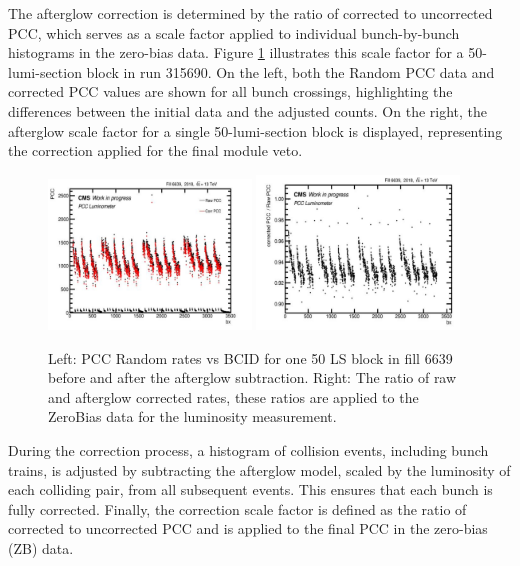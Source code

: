The afterglow correction is determined by the ratio of corrected to uncorrected PCC, which serves as a scale factor applied to individual bunch-by-bunch histograms in the zero-bias data. Figure \ref{fig:afterglowcorrection} illustrates this scale factor for a 50-lumi-section block in run 315690. On the left, both the Random PCC data and corrected PCC values are shown for all bunch crossings, highlighting the differences between the initial data and the adjusted counts. On the right, the afterglow scale factor for a single 50-lumi-section block is displayed, representing the correction applied for the final module veto.


\begin{figure}[H]
    \centering
    \includegraphics[width=0.48\textwidth]{figures/performance_PCC/afterglow_correction_factor_1lsblock_315690_2.png}
    \includegraphics[width=0.48\textwidth]{figures/performance_PCC/afterglow_correction_factor_1lsblock_315690_3.png}
    \caption[PCC Random Rates vs BCID Before and After Afterglow Subtraction (Fill 6639)]{Left: PCC Random rates vs BCID for one 50 LS block in fill 6639 before and after the afterglow subtraction. Right: The ratio of raw and afterglow corrected rates, these ratios are applied to the ZeroBias data for the luminosity measurement.}
    \label{fig:afterglowcorrection}
\end{figure}


During the correction process, a histogram of collision events, including bunch trains, is adjusted by subtracting the afterglow model, scaled by the luminosity of each colliding pair, from all subsequent events. This ensures that each bunch is fully corrected. Finally, the correction scale factor is defined as the ratio of corrected to uncorrected PCC and is applied to the final PCC in the zero-bias (ZB) data.



